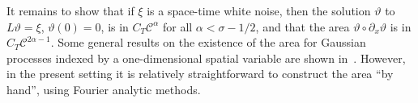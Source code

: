 \documentclass[11pt,a4paper]{article}
\newcommand{\mathD}{\mathrm{D}}
\newcommand{\mathd}{\mathrm{d}}
\theoremstyle{remark}
\newcommand{\R}{\mathbb{R}}
\newcommand{\Z}{\mathbb{Z}}
\newcommand{\E}{\mathbb{E}}
\newcommand{\CC}{\ensuremath{\mathscr{C}}}
\newcommand{\CF}{\ensuremath{\mathscr{F}}}
\begin{document}
%

It remains to show that if $\xi$ is a space-time white noise, then the solution $\vartheta$ to $L \vartheta = \xi$, $\vartheta(0) = 0$, is in $C_T\CC^\alpha$ for all $\alpha < \sigma - 1/2$, and that the area $\vartheta \circ \partial_x \vartheta$ is in $C_T \CC^{2 \alpha - 1}$. Some general results on the existence of the area for Gaussian processes indexed by a one-dimensional spatial variable are shown in~\cite{Friz2012}. However, in the present setting it is relatively straightforward to construct the area ``by hand'', using Fourier analytic methods.
%
\end{document}
